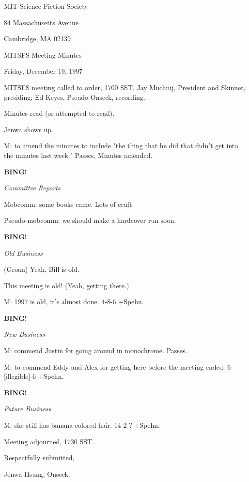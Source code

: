 \documentclass[12pt]{article}
\newcommand{\bing}{{\bf BING!} }
\newcommand{\goto}[1]{\bing \vskip 12pt \centerline{{\em{#1}}}}
\begin{document}
\begin{center}

MIT Science Fiction Society 

84 Massachusetts Avenue

Cambridge, MA 02139

\vspace{12pt}

MITSFS Meeting Minutes 

Friday, December 19, 1997

\end{center}
 
\vspace{18pt}

\setlength{\parskip}{6pt}

\noindent
MITSFS meeting called to order, 1700 SST,
Jay Muchnij, President and Skinner, presiding; 
Ed Keyes, Pseudo-Onseck, recording.

Minutes read (or attempted to read).

Jenwa shows up.

M: to amend the minutes to include "the thing that he did that didn't get into the minutes last week." Passes. Minutes amended.

\goto{Committee Reports}

Mobcomm: some books came. Lots of cruft.

Pseudo-mobcomm: we should make a hardcover run soon.

\goto{Old Business}

(Groan) Yeah, Bill is old.

This meeting is old! (Yeah, getting there.)

M: 1997 is old, it's almost done. 4-8-6 +Spehn.

\goto{New Business}

M: commend Justin for going around in monochrome. Passes.

M: to commend Eddy and Alex for getting here before the meeting ended. 6-[illegible]-6 +Spehn.

\goto{Future Business}

M: she still has banana colored hair. 14-2-? +Spehn.

\vspace{12pt}

\noindent
Meeting adjourned, 1730 SST.

\vspace{18pt}

\centerline{Respectfully submitted,}
\centerline{Jenwa Hsung, Onseck}
\end{document}
